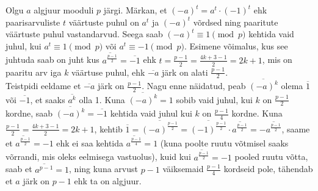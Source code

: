 \documentclass[a4paper, 10pt]{article}
\newcommand{\w}{\overline}
\begin{document}
\bigskip
Olgu $a$ algjuur mooduli $p$ järgi. Märkan, et $(-a)^t=a^t\cdot(-1)^t$ ehk paarisarvuliste $t$ väärtuste puhul on $a^t$ ja $ (-a)^t$ võrdsed ning paaritute väärtuste puhul vastandarvud. Seega saab $(-a)^t\equiv1\pmod p$ kehtida vaid juhul, kui $a^t\equiv1\pmod p$ või $a^t\equiv-1\pmod p$. Esimene võimalus, kus see juhtuda saab on juht kus $\w{a^{\frac{p-1}{2}}}=\w{-1}$ ehk $t=\frac{p-1}2=\frac{4k+3-1}{2}=2k+1$, mis on paaritu arv iga $k$ väärtuse puhul, ehk $\w{-a}$ järk on alati $\frac{p-1}2$.\\
\indent Teistpidi eeldame et $\w{-a}$ järk on $\frac{p-1}2$. Nagu enne näidatud, peab $\w{(-a)^k}$ olema $\w1$ või $\w{-1}$, et saaks $\w{a^k}$ olla 1. Kuna $\w{(-a)^k}=1$ sobib vaid juhul, kui $k$ on $\frac{p-1}2$ kordne, saab $\w{(-a)^k}=\w{-1}$ kehtida vaid juhul kui $k$ on $\frac{p-1}4$ kordne. Kuna $\frac {p-1}2=\frac{4k+3-1}{2}=2k+1$, kehtib $\w1=\w{(-a)^\frac{p-1}{2}}=\w{(-1)^\frac{p-1}{2}}\cdot\w{a^\frac{p-1}{2}}=-\w{a^\frac{p-1}{2}}$, saame et $\w{a^\frac{p-1}{2}}=-1$ ehk ei saa kehtida $\w{a^\frac{p-1}{4}}=1$ (kuna poolte ruutu võtmisel saaks võrrandi, mis oleks eelmisega vastuolus), kuid kui $\w{a^\frac{p-1}{2}}=-1$ pooled ruutu võtta, saab et $\w{a^{p-1}}=1$, ning kuna arvust $p-1$ väiksemaid $\frac{p-1}4$ kordseid pole, tähendab et $a$ järk on $p-1$ ehk ta on algjuur.
\bigskip
\end{document}
